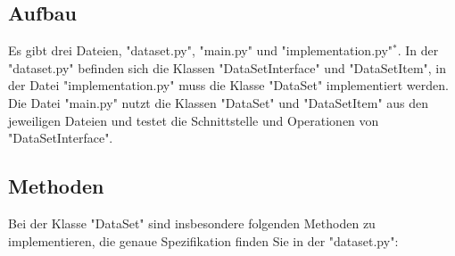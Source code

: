 \documentclass[]{article}
\begin{document}
\subsection{Aufbau}
Es gibt drei Dateien, "dataset.py", "main.py" und "implementation.py"$^*$.
In der "dataset.py" befinden sich die Klassen "DataSetInterface" und "DataSetItem",
in der Datei "implementation.py" muss die Klasse "DataSet" implementiert werden.
Die Datei "main.py" nutzt die Klassen "DataSet" und "DataSetItem" aus den jeweiligen Dateien und testet die Schnittstelle und Operationen von "DataSetInterface".\\

\subsection{Methoden}
Bei der Klasse "DataSet" sind insbesondere folgenden Methoden zu implementieren, die genaue Spezifikation finden Sie in der "dataset.py":\\
\end{document}
